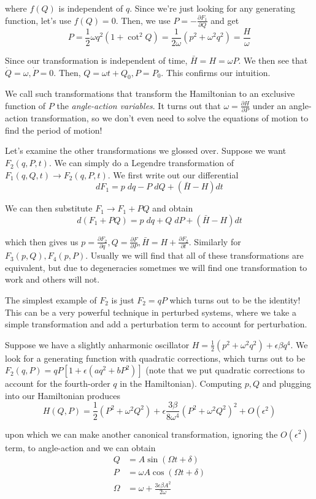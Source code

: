 \documentclass[10pt]{report}
\newcommand{\pd}[2]{\frac{\partial #1}{\partial#2}}
\begin{document}
where $f(Q)$ is independent of $q$. Since we're just looking for any generating function, let's use $f(Q) = 0$. Then, we use $P = -\pd{F_1}{Q}$ and get 
$$P = \frac{1}{2}\omega q^2 (1+\cot^2 Q) = \frac{1}{2\omega}(p^2 + \omega^2q^2) = \frac{H}{\omega}$$

Since our transformation is independent of time, $\bar{H} = H = \omega P$. We then see that $\dot{Q} = \omega, \dot{P} = 0$. Then, $Q = \omega t + Q_0, P = P_0$. This confirms our intuition. 

We call such transformations that transform the Hamiltonian to an exclusive function of $P$ the \emph{angle-action variables}. It turns out that $\omega = \pd{H}{P}$ under an angle-action transformation, so we don't even need to solve the equations of motion to find the period of motion!

Let's examine the other transformations we glossed over. Suppose we want $F_2(q,P,t)$. We can simply do a Legendre transformation of $F_1(q,Q,t) \to F_2(q,P,t)$. We first write out our differential
$$dF_1 = p\; dq - P \; dQ + \left( \bar{H} - H \right)dt$$

We can then substitute $F_1 \to F_1 + PQ$ and obtain
$$d(F_1 + PQ) = p\; dq + Q \; dP + (\bar{H} - H) dt$$

which then gives us $p = \pd{F_2}{q}, Q = \pd{F}{P}, \bar{H} = H + \pd{F_2}{t}$. Similarly for $F_3(p,Q), F_4(p,P)$. Usually we will find that all of these transformations are equivalent, but due to degeneracies sometmes we will find one transformation to work and others will not. 

The simplest example of $F_2$ is just $F_2 = qP$ which turns out to be the identity! This can be a very powerful technique in perturbed systems, where we take a simple transformation and add a perturbation term to account for perturbation. 

Suppose we have a slightly anharmonic oscillator $H = \frac{1}{2}(p^2 + \omega^2 q^2) + \epsilon\beta q^4$. We look for a generating function with quadratic corrections, which turns out to be $F_2(q,P) = qP\left[ 1+\epsilon(aq^2 + bP^2) \right]$ (note that we put quadratic corrections to account for the fourth-order $q$ in the Hamiltonian). Computing $p,Q$ and plugging into our Hamiltonian produces
$$H(Q,P) = \frac{1}{2}(P^2 + \omega^2Q^2) + \epsilon \frac{3\beta}{8\omega^4}(P^2 + \omega^2Q^2)^2 + O(\epsilon^2)$$

upon which we can make another canonical transformation, ignoring the $O(\epsilon^2)$ term, to angle-action and we can obtain
\begin{align*}
    Q &= A\sin\left( \Omega t + \delta \right)\\
    P &= \omega A \cos (\Omega t + \delta)\\
    \Omega &= \omega +\frac{3\epsilon\beta A^2}{2\omega} 
\end{align*}
\end{document}
